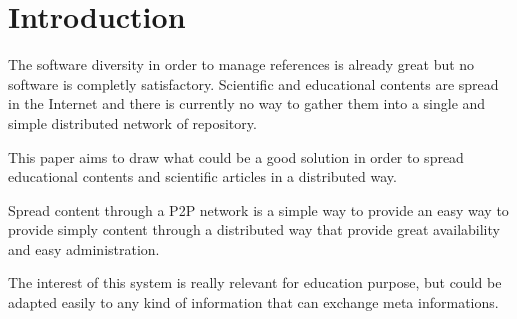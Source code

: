 \section{Introduction}

The software diversity in order to manage references is already
great but no software is completly satisfactory. Scientific and
educational contents are spread in the Internet and there is currently
no way to gather them into a single and simple distributed network of repository.

This paper aims to draw what could be a good solution in order to
spread educational contents and scientific articles in a distributed
way.

Spread content through a P2P network is a simple way to provide an easy way to
provide simply content through a distributed way that provide great availability
and easy administration.

The interest of this system is really relevant for education purpose, but could be 
adapted easily to any kind of information that can exchange meta informations.
